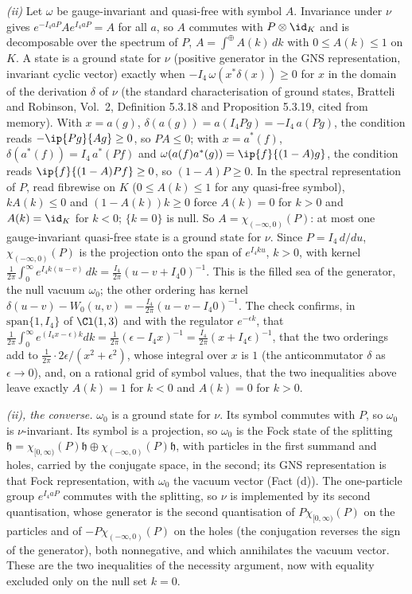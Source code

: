 \emph{(ii)} Let $\omega$ be gauge-invariant and quasi-free with symbol $A$. Invariance under $\nu$ gives $e^{-I_{4}aP}Ae^{I_{4}aP} = A$ for all $a$, so $A$ commutes with $P\otimes\id_{K}$ and is decomposable over the spectrum of $P$, $A = \int^{\oplus}A(k)\,dk$ with $0 \le A(k) \le 1$ on $K$. A state is a ground state for $\nu$ (positive generator in the GNS representation, invariant cyclic vector) exactly when $-I_{4}\,\omega(x^{*}\delta(x)) \ge 0$ for $x$ in the domain of the derivation $\delta$ of $\nu$ (the standard characterisation of ground states, Bratteli and Robinson, Vol.~2, Definition 5.3.18 and Proposition 5.3.19, cited from memory). With $x = a(g)$, $\delta(a(g)) = a(I_{4}Pg) = -I_{4}\,a(Pg)$, the condition reads $-\ip{Pg}{Ag} \ge 0$, so $PA \le 0$; with $x = a^{*}(f)$, $\delta(a^{*}(f)) = I_{4}\,a^{*}(Pf)$ and $\omega(a(f)a^{*}(g)) = \ip{f}{(1 - A)g}$, the condition reads $\ip{f}{(1 - A)Pf} \ge 0$, so $(1 - A)P \ge 0$. In the spectral representation of $P$, read fibrewise on $K$ ($0 \le A(k) \le 1$ for any quasi-free symbol), $kA(k) \le 0$ and $(1 - A(k))k \ge 0$ force $A(k) = 0$ for $k > 0$ and $A(k) = \id_{K}$ for $k < 0$; $\{k = 0\}$ is null. So $A = \chi_{(-\infty,0)}(P)$: at most one gauge-invariant quasi-free state is a ground state for $\nu$. Since $P = I_{4}\,d/du$, $\chi_{(-\infty,0)}(P)$ is the projection onto the span of $e^{I_{4}ku}$, $k > 0$, with kernel $\tfrac{1}{2\pi}\int_{0}^{\infty}e^{I_{4}k(u - v)}\,dk = \tfrac{I_{4}}{2\pi}(u - v + I_{4}0)^{-1}$. This is the filled sea of the generator, the null vacuum $\omega_{0}$; the other ordering has kernel $\delta(u - v) - W_{0}(u, v) = -\tfrac{I_{4}}{2\pi}(u - v - I_{4}0)^{-1}$. The check confirms, in $\mathrm{span}\{1, I_{4}\}$ of $\Cl(1,3)$ and with the regulator $e^{-\epsilon k}$, that $\tfrac{1}{2\pi}\int_{0}^{\infty}e^{(I_{4}x - \epsilon)k}dk = \tfrac{1}{2\pi}(\epsilon - I_{4}x)^{-1} = \tfrac{I_{4}}{2\pi}(x + I_{4}\epsilon)^{-1}$, that the two orderings add to $\tfrac{1}{2\pi}\cdot 2\epsilon/(x^{2} + \epsilon^{2})$, whose integral over $x$ is $1$ (the anticommutator $\delta$ as $\epsilon \to 0$), and, on a rational grid of symbol values, that the two inequalities above leave exactly $A(k) = 1$ for $k < 0$ and $A(k) = 0$ for $k > 0$.

\emph{(ii), the converse.} $\omega_{0}$ is a ground state for $\nu$. Its symbol commutes with $P$, so $\omega_{0}$ is $\nu$-invariant. Its symbol is a projection, so $\omega_{0}$ is the Fock state of the splitting $\mathfrak{h} = \chi_{[0,\infty)}(P)\mathfrak{h} \oplus \chi_{(-\infty,0)}(P)\mathfrak{h}$, with particles in the first summand and holes, carried by the conjugate space, in the second; its GNS representation is that Fock representation, with $\omega_{0}$ the vacuum vector (Fact (d)). The one-particle group $e^{I_{4}aP}$ commutes with the splitting, so $\nu$ is implemented by its second quantisation, whose generator is the second quantisation of $P\chi_{[0,\infty)}(P)$ on the particles and of $-P\chi_{(-\infty,0)}(P)$ on the holes (the conjugation reverses the sign of the generator), both nonnegative, and which annihilates the vacuum vector. These are the two inequalities of the necessity argument, now with equality excluded only on the null set $k = 0$.

